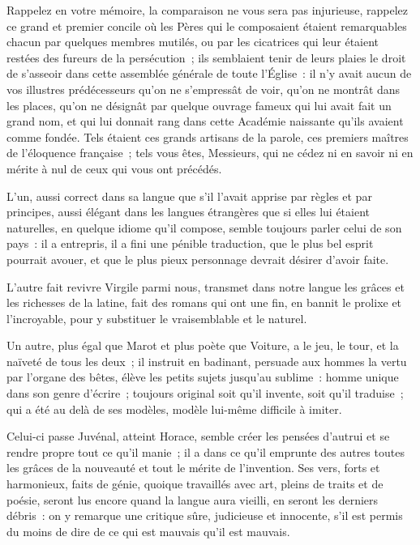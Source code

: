 \documentclass[french,twoside]{book} %
\begin{document}
Rappelez en votre mémoire, la comparaison ne vous sera pas injurieuse, rappelez ce grand et premier concile où les Pères qui le composaient étaient remarquables chacun par quelques membres mutilés, ou par les cicatrices qui leur étaient restées des fureurs de la persécution ; ils semblaient tenir de leurs plaies le droit de s’asseoir dans cette assemblée générale de toute l’Église : il n’y avait aucun de vos illustres prédécesseurs qu’on ne s’empressât de voir, qu’on ne montrât dans les places, qu’on ne désignât par quelque ouvrage fameux qui lui avait fait un grand nom, et qui lui donnait rang dans cette Académie naissante qu’ils avaient comme fondée. Tels étaient ces grands artisans de la parole, ces premiers maîtres de l’éloquence française ; tels vous êtes, Messieurs, qui ne cédez ni en savoir ni en mérite à nul de ceux qui vous ont précédés.\par
L'un, aussi correct dans sa langue que s’il l’avait apprise par règles et par principes, aussi élégant dans les langues étrangères que si elles lui étaient naturelles, en quelque idiome qu’il compose, semble toujours parler celui de son pays : il a entrepris, il a fini une pénible traduction, que le plus bel esprit pourrait avouer, et que le plus pieux personnage devrait désirer d’avoir faite.\par
L'autre fait revivre Virgile parmi nous, transmet dans notre langue les grâces et les richesses de la latine, fait des romans qui ont une fin, en bannit le prolixe et l’incroyable, pour y substituer le vraisemblable et le naturel.\par
Un autre, plus égal que Marot et plus poète que Voiture, a le jeu, le tour, et la naïveté de tous les deux ; il instruit en badinant, persuade aux hommes la vertu par l’organe des bêtes, élève les petits sujets jusqu’au sublime : homme unique dans son genre d’écrire ; toujours original soit qu’il invente, soit qu’il traduise ; qui a été au delà de ses modèles, modèle lui-même difficile à imiter.\par
Celui-ci passe Juvénal, atteint Horace, semble créer les pensées d’autrui et se rendre propre tout ce qu’il manie ; il a dans ce qu’il emprunte des autres toutes les grâces de la nouveauté et tout le mérite de l’invention. Ses vers, forts et harmonieux, faits de génie, quoique travaillés avec art, pleins de traits et de poésie, seront lus encore quand la langue aura vieilli, en seront les derniers débris : on y remarque une critique sûre, judicieuse et innocente, s’il est permis du moins de dire de ce qui est mauvais qu’il est mauvais.\par
\end{document}

